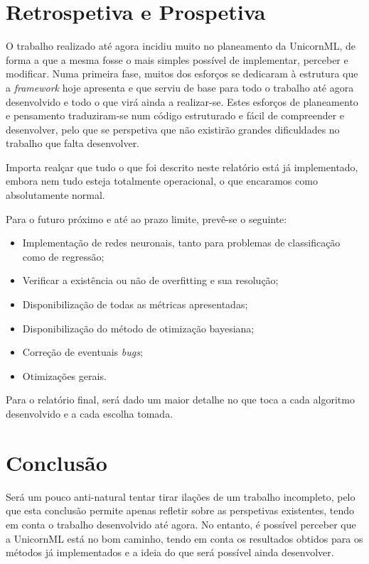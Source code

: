 \documentclass[a4paper]{report}
\begin{document}
\chapter{Retrospetiva e Prospetiva} \label{ch:futureWork}
\large{
	O trabalho realizado até agora incidiu muito no planeamento da UnicornML, de forma a que a mesma fosse o mais simples possível de implementar, perceber e modificar.
	Numa primeira fase, muitos dos esforços se dedicaram à estrutura que a \textit{framework} hoje apresenta e que serviu de base para todo o trabalho até agora desenvolvido e todo o que virá ainda a realizar-se.
	Estes esforços de planeamento e pensamento traduziram-se num código estruturado e fácil de compreender e desenvolver, pelo que se perspetiva que não existirão grandes dificuldades no trabalho que falta desenvolver.

	Importa realçar que tudo o que foi descrito neste relatório está já implementado, embora nem tudo esteja totalmente operacional, o que encaramos como absolutamente normal.

	Para o futuro próximo e até ao prazo limite, prevê-se o seguinte:
	\begin{itemize}
		\item Implementação de redes neuronais, tanto para  problemas de classificação como de regressão;
		\item Verificar a existência ou não de overfitting e sua resolução;
		\item Disponibilização de todas as métricas apresentadas;
		\item Disponibilização do método de otimização bayesiana;
		\item Correção de eventuais \textit{bugs};
		\item Otimizações gerais.
	\end{itemize}

	Para o relatório final, será dado um maior detalhe no que toca a cada algoritmo desenvolvido e a cada escolha tomada.
}

\chapter{Conclusão} \label{ch:Conclusion}
\large{
	Será um pouco anti-natural tentar tirar ilações de um trabalho incompleto, pelo que esta conclusão permite apenas refletir sobre as perspetivas existentes, tendo em conta o trabalho desenvolvido até agora.
	No entanto, é possível perceber que a UnicornML está no bom caminho, tendo em conta os resultados obtidos para os métodos já implementados e a ideia do que será possível ainda desenvolver.
}
\end{document}
